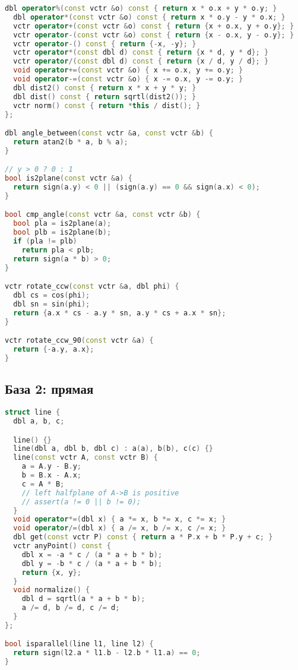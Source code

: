 \documentclass[9pt,a4paper,landscape,twosided]{extarticle}
\begin{document}
\begin{multicols*}{3}
\begin{lstlisting}[language=C++]
  dbl operator%(const vctr &o) const { return x * o.x + y * o.y; }
  dbl operator*(const vctr &o) const { return x * o.y - y * o.x; }
  vctr operator+(const vctr &o) const { return {x + o.x, y + o.y}; }
  vctr operator-(const vctr &o) const { return {x - o.x, y - o.y}; }
  vctr operator-() const { return {-x, -y}; }
  vctr operator*(const dbl d) const { return {x * d, y * d}; }
  vctr operator/(const dbl d) const { return {x / d, y / d}; }
  void operator+=(const vctr &o) { x += o.x, y += o.y; }
  void operator-=(const vctr &o) { x -= o.x, y -= o.y; }
  dbl dist2() const { return x * x + y * y; }
  dbl dist() const { return sqrtl(dist2()); }
  vctr norm() const { return *this / dist(); }
};

dbl angle_between(const vctr &a, const vctr &b) {
  return atan2(b * a, b % a);
}

// y > 0 ? 0 : 1
bool is2plane(const vctr &a) {
  return sign(a.y) < 0 || (sign(a.y) == 0 && sign(a.x) < 0);
}

bool cmp_angle(const vctr &a, const vctr &b) {
  bool pla = is2plane(a);
  bool plb = is2plane(b);
  if (pla != plb)
    return pla < plb;
  return sign(a * b) > 0;
}

vctr rotate_ccw(const vctr &a, dbl phi) {
  dbl cs = cos(phi);
  dbl sn = sin(phi);
  return {a.x * cs - a.y * sn, a.y * cs + a.x * sn};
}

vctr rotate_ccw_90(const vctr &a) {
  return {-a.y, a.x};
}

\end{lstlisting}

\subsection{База 2: прямая}
\begin{lstlisting}[language=C++]
struct line {
  dbl a, b, c;

  line() {}
  line(dbl a, dbl b, dbl c) : a(a), b(b), c(c) {}
  line(const vctr A, const vctr B) {
    a = A.y - B.y;
    b = B.x - A.x;
    c = A * B;
    // left halfplane of A->B is positive
    // assert(a != 0 || b != 0);
  }
  void operator*=(dbl x) { a *= x, b *= x, c *= x; }
  void operator/=(dbl x) { a /= x, b /= x, c /= x; }
  dbl get(const vctr P) const { return a * P.x + b * P.y + c; }
  vctr anyPoint() const {
    dbl x = -a * c / (a * a + b * b);
    dbl y = -b * c / (a * a + b * b);
    return {x, y};
  }
  void normalize() {
    dbl d = sqrtl(a * a + b * b);
    a /= d, b /= d, c /= d;
  }
};

bool isparallel(line l1, line l2) {
  return sign(l2.a * l1.b - l2.b * l1.a) == 0;
}


\end{lstlisting}
\end{multicols*}
\end{document}

